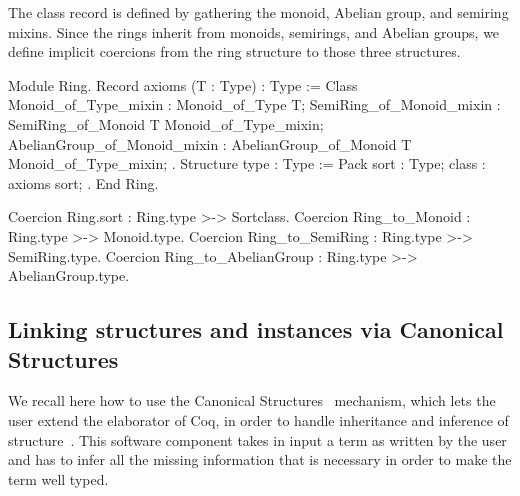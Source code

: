 \documentclass[a4paper,UKenglish,cleveref, autoref]{lipics-v2019}
\newcommand{\mixins}{mixins}
\theoremstyle{implem}
\theoremstyle{implem}
\theoremstyle{command}
\theoremstyle{commands}
\begin{document}
The class record is defined by gathering the monoid, Abelian group, and
semiring \mixins{}. Since the rings inherit from monoids, semirings, and
Abelian groups, we define implicit coercions from the ring structure to those
three structures.
\begin{coqcode}
Module Ring.
Record axioms (T : Type) : Type := Class {
  Monoid_of_Type_mixin : Monoid_of_Type T;
  SemiRing_of_Monoid_mixin : SemiRing_of_Monoid T Monoid_of_Type_mixin;
  AbelianGroup_of_Monoid_mixin : AbelianGroup_of_Monoid T Monoid_of_Type_mixin; }.
Structure type : Type := Pack { sort : Type; class : axioms sort; }.
End Ring.

Coercion Ring.sort : Ring.type >-> Sortclass.
Coercion Ring_to_Monoid : Ring.type >-> Monoid.type.
Coercion Ring_to_SemiRing : Ring.type >-> SemiRing.type.
Coercion Ring_to_AbelianGroup : Ring.type >-> AbelianGroup.type.
\end{coqcode}

\subsection{Linking structures and instances via Canonical Structures}

We recall here how to use the Canonical
Structures~\cite{DBLP:conf/itp/MahboubiT13,Saibi99phd} mechanism, which
lets the user extend the elaborator of Coq, in order to handle
inheritance and inference of structure~\cite{affeldt:hal-02463336,KSdraft,DBLP:conf/tphol/GarillotGMR09}.
This software component
takes in input a term as written by the user and has to infer all the missing information that is necessary in order to make the term well typed.
\end{document}
